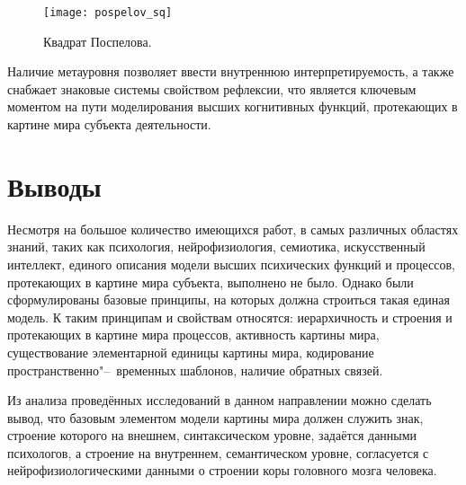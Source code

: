 \begin{figure}[h]
	\centering
	\texttt{[image: pospelov\_sq]}
	\caption{Квадрат Поспелова.}
	\label{fg:pospelov_sq}
\end{figure}
	
Наличие метауровня позволяет ввести внутреннюю интерпретируемость, а также снабжает знаковые системы свойством рефлексии, что является ключевым моментом на пути моделирования высших когнитивных функций, протекающих в картине мира субъекта деятельности.


\section{Выводы} \label{sect1_4}

Несмотря на большое количество имеющихся работ, в самых различных областях знаний, таких как психология, нейрофизиология, семиотика, искусственный интеллект, единого описания модели высших психических функций и процессов, протекающих в картине мира субъекта, выполнено не было. Однако были сформулированы базовые принципы, на которых должна строиться такая единая модель. К таким принципам и свойствам относятся: иерархичность и строения и протекающих в картине мира процессов, активность картины мира, существование элементарной единицы картины мира, кодирование пространственно"--~временных шаблонов, наличие обратных связей. 

Из анализа проведённых исследований в данном направлении можно сделать вывод, что базовым элементом модели картины мира должен служить знак, строение которого на внешнем, синтаксическом уровне, задаётся данными психологов, а строение на внутреннем, семантическом уровне, согласуется с нейрофизиологическими данными о строении коры головного мозга человека.

\clearpage